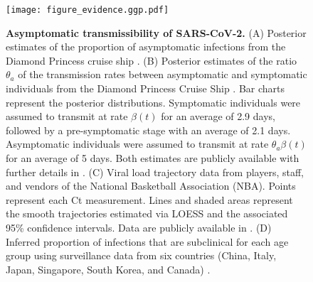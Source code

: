 \documentclass[12pt]{article}
\begin{document}
\begin{figure}[!ht]
\texttt{[image: figure\_evidence.ggp.pdf]}
\caption{
\textbf{Asymptomatic transmissibility of SARS-CoV-2.}
(A) Posterior estimates of the proportion of asymptomatic infections from the Diamond Princess cruise ship \cite{emery2020}.
(B) Posterior estimates of the ratio $\theta_a$ of the transmission rates between asymptomatic and symptomatic individuals from the Diamond Princess Cruise Ship \cite{emery2020}.
Bar charts represent the posterior distributions.
Symptomatic individuals were assumed to transmit at rate $\beta(t)$ for an average of 2.9 days, followed by a pre-symptomatic stage with an average of 2.1 days. 
Asymptomatic individuals were assumed to transmit at rate $\theta_a \beta(t)$ for an average of 5 days.
Both estimates are publicly available with further details in \cite{emery2020}.
(C) Viral load trajectory data from players, staff, and vendors of the National Basketball Association (NBA).
Points represent each Ct measurement.
Lines and shaded areas represent the smooth trajectories estimated via LOESS and the associated 95\% confidence intervals.
Data are publicly available in \cite{Kissler2020}.
(D) Inferred proportion of infections that are subclinical for each age group using surveillance data from six countries (China, Italy, Japan, Singapore, South Korea, and Canada) \cite{davies2020}.
}
\label{fig:evidence}
\end{figure}
\end{document}
